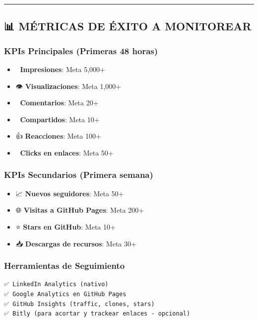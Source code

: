 \documentclass[
]{article}
\providecommand{\tightlist}{%
  \setlength{\itemsep}{0pt}\setlength{\parskip}{0pt}}
\begin{document}
\begin{center}\rule{0.5\linewidth}{0.5pt}\end{center}

\subsection{📊 MÉTRICAS DE ÉXITO A
MONITOREAR}\label{muxe9tricas-de-uxe9xito-a-monitorear}

\subsubsection{KPIs Principales (Primeras 48
horas)}\label{kpis-principales-primeras-48-horas}

\begin{itemize}
\tightlist
\item
  🎯 \textbf{Impresiones}: Meta 5,000+
\item
  👁️ \textbf{Visualizaciones}: Meta 1,000+
\item
  💬 \textbf{Comentarios}: Meta 20+
\item
  🔄 \textbf{Compartidos}: Meta 10+
\item
  👍 \textbf{Reacciones}: Meta 100+
\item
  🔗 \textbf{Clicks en enlaces}: Meta 50+
\end{itemize}

\subsubsection{KPIs Secundarios (Primera
semana)}\label{kpis-secundarios-primera-semana}

\begin{itemize}
\tightlist
\item
  📈 \textbf{Nuevos seguidores}: Meta 50+
\item
  🌐 \textbf{Visitas a GitHub Pages}: Meta 200+
\item
  ⭐ \textbf{Stars en GitHub}: Meta 10+
\item
  📥 \textbf{Descargas de recursos}: Meta 30+
\end{itemize}

\subsubsection{Herramientas de
Seguimiento}\label{herramientas-de-seguimiento}

\begin{verbatim}
✅ LinkedIn Analytics (nativo)
✅ Google Analytics en GitHub Pages
✅ GitHub Insights (traffic, clones, stars)
✅ Bitly (para acortar y trackear enlaces - opcional)
\end{verbatim}
\end{document}
